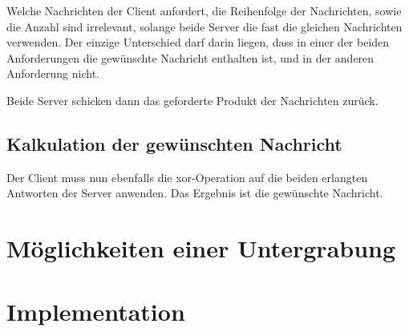 \documentclass[]{article}
\begin{document}
Welche Nachrichten der Client anfordert, die Reihenfolge der Nachrichten, sowie die Anzahl sind irrelevant, solange beide Server die fast die gleichen Nachrichten verwenden. Der einzige Unterschied darf darin liegen, dass in einer der beiden Anforderungen die gewünschte Nachricht enthalten ist, und in der anderen Anforderung nicht.

Beide Server schicken dann das geforderte Produkt der Nachrichten zurück.

\subsection{Kalkulation der gewünschten Nachricht}
Der Client muss nun ebenfalls die xor-Operation auf die beiden erlangten Antworten der Server anwenden. Das Ergebnis ist die gewünschte Nachricht.

\section{Möglichkeiten einer Untergrabung}

\section{Implementation}
\end{document}
